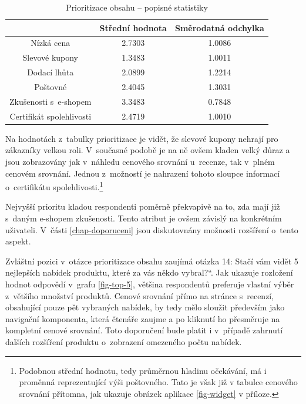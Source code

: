 \documentclass[12pt,twoside,openany]{fithesis}
\begin{document}
      \begin{table}[htb]
          \begin{center}%
              \begin{tabular}{|c|c|c|}
                  \hline 
                  {{}} & {{Střední hodnota}} & {{Směrodatná odchylka}} 
\tabularnewline
                   \hline 
                   {{Nízká cena}} & {{2.7303}} & {{1.0086}} \tabularnewline
                    \hline 
                    {{Slevové kupony}} & {{1.3483}} & {{1.0011}} 
\tabularnewline
                     \hline 
                     {{Dodací lhůta}} & {{2.0899}} & {{1.2214}} 
\tabularnewline
                      \hline 
                      {{Poštovné}} & {{2.4045}} & {{1.3031}} \tabularnewline
                       \hline 
                       {{Zkušenosti s~e-shopem}} & {{3.3483}} & {{0.7848}} 
\tabularnewline
                        \hline 
                        {{Certifikát spolehlivosti}} & {{2.4719}} & {{1.0010}} 
\tabularnewline
                        \hline 
                    \end{tabular}
                    \caption{Prioritizace obsahu -- popisné statistiky}\label{tab-prioritizace}
                \end{center}
            \end{table}

            Na hodnotách z~tabulky prioritizace je vidět, že slevové kupony 
nehrají pro zákazníky velkou roli. V~současné podobě je na ně ovšem 
kladen velký důraz a jsou zobrazovány jak v~náhledu cenového srovnání 
u~recenze, tak v~plném cenovém srovnání. Jednou z~možností je nahrazení 
tohoto sloupce informací o~certifikátu spolehlivosti.\footnote{
    Podobnou střední hodnotu, tedy průměrnou hladinu očekávání, má i proměnná
    reprezentující výši poštovného. Tato je však již v tabulce cenového
    srovnání přítomna, jak ukazuje obrázek aplikace \hyperlink{fig-widget}{{\ref{fig-widget}}} v příloze.
}

            Nejvyšší prioritu kladou respondenti poměrně překvapivě na 
to, zda mají již s~daným e-shopem zkušenosti. Tento atribut je ovšem 
závislý na konkrétním uživateli. V~části 
\hyperlink{chap-doporuceni}{{\ref{chap-doporuceni}}} jsou diskutovnány 
možnosti rozšíření o~tento aspekt.

            Zvláštní pozici v~otázce prioritizace obsahu zaujímá otázka 
14: \glqq Stačí vám vidět 5 nejlepších nabídek produktu, které za vás 
někdo vybral?\textquotedblleft{}. Jak ukazuje rozložení hodnot odpovědí 
v~grafu \hyperlink{fig-top-5}{{\ref{fig-top-5}}}, většina respondentů 
preferuje vlastní výběr z~většího množství produktů. Cenové 
srovnání přímo na stránce s~recenzí, obsahující pouze pět vybraných 
nabídek, by tedy mělo sloužit především jako navigační komponenta, 
která čtenáře zaujme a po kliknutí ho přesměruje na kompletní cenové 
srovnání. Toto doporučení bude platit i v~případě zahrnutí dalších 
rozšíření produktu o~zobrazení omezeného počtu nabídek.
\end{document}
